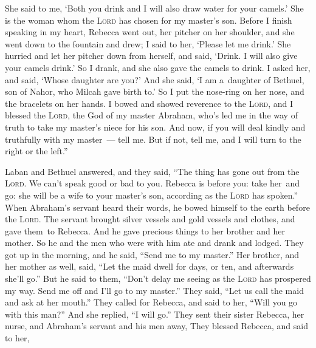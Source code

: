 \begin{inparaenum}
     She said to me, `Both you drink and I will also draw water for your camels.' She is the woman whom the \textsc{Lord} has chosen for my master's son.%
     Before I finish speaking in my heart, Rebecca went out, her pitcher on her shoulder, and she went down to the fountain and drew; I said to her, `Please let me drink.'%
     She hurried and let her pitcher down from herself, and said, `Drink. I will also give your camels drink.' So I drank, and she also gave the camels to drink.%
     I asked her, and said, `Whose daughter are you?' And she said, `I am a\understood\ daughter of Bethuel, son of Nahor, who Milcah gave birth to.' So I put the nose-ring on her nose, and the bracelets on her hands.%
     I bowed and showed reverence to the \textsc{Lord}, and I blessed the \textsc{Lord}, the God of my master Abraham, who's led me in the way of truth to take my master's niece for his son.%
     And now, if you will deal kindly and truthfully with my master~--- tell me. But if not, tell me, and I will turn to the right or the left.''%
    
     Laban and Bethuel answered, and they said, ``The thing has gone out from the \textsc{Lord}. We can't speak good or bad to you.%
     Rebecca is before you: take her\understood\ and go: she will be a wife to your master's son, according as the \textsc{Lord} has spoken.''%
     When Abraham's servant heard their words, he bowed himself to the earth before the \textsc{Lord}.%
     The servant brought silver vessels and gold vessels and clothes, and gave them\understood\ to Rebecca. And he gave precious things to her brother and her mother.%
     So he and the men who were with him ate and drank and lodged. They got up in the morning, and he said, ``Send me to my master.''%
     Her brother, and her mother as well, said, ``Let the maid dwell for days, or ten, and afterwards she'll go.''%
     But he said to them, ``Don't delay me seeing as the \textsc{Lord} has prospered my way. Send me off and I'll go to my master.''%
     They said, ``Let us call the maid and ask at her mouth.''%
     They called for Rebecca, and said to her, ``Will you go with this man?'' And she replied, ``I will go.''%
     They sent their sister Rebecca, her nurse, and Abraham's servant and his men away,%
     They blessed Rebecca, and said to her,\smallskip%
    

\end{inparaenum}
